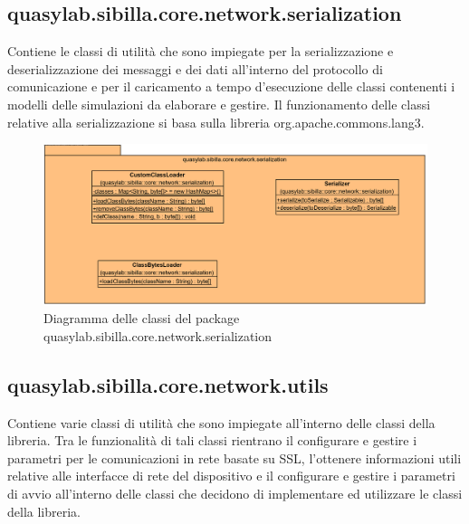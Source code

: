 \subsection{quasylab.sibilla.core.network.serialization} Contiene le classi di utilità che sono impiegate per la serializzazione e deserializzazione dei messaggi e dei dati all’interno del protocollo di comunicazione e per il caricamento a tempo d’esecuzione delle classi contenenti i modelli delle simulazioni da elaborare e gestire. Il funzionamento delle classi relative alla serializzazione si basa sulla libreria org.apache.commons.lang3.

\begin{figure}[H]
    \includegraphics[width=\linewidth]{images/quasylab.sibilla.core.network.serialization.png}
    \captionsetup{justification=centering}
    \caption{Diagramma delle classi del package quasylab.sibilla.core.network.serialization}
  \end{figure}

\subsection{quasylab.sibilla.core.network.utils} Contiene varie classi di utilità che sono impiegate all’interno delle classi della libreria. Tra le funzionalità di tali classi rientrano il configurare e gestire i parametri per le comunicazioni in rete basate su SSL, l’ottenere informazioni utili relative alle interfacce di rete del dispositivo e il configurare e gestire i parametri di avvio all’interno delle classi che decidono di implementare ed utilizzare le classi della libreria.

